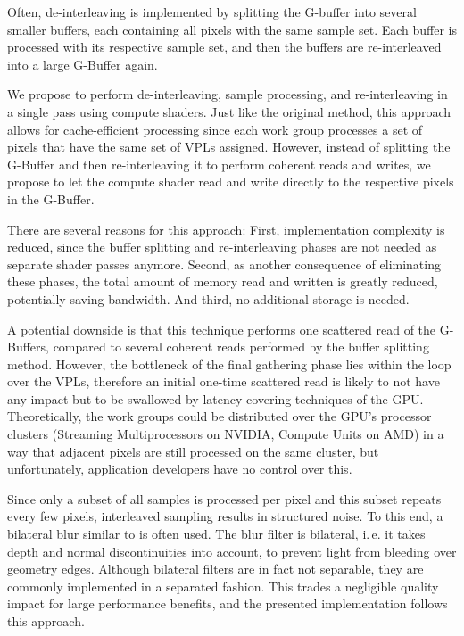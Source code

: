 Often, de-interleaving is implemented by splitting the G-buffer into several smaller buffers, each containing all pixels with the same sample set. Each buffer is processed with its respective sample set, and then the buffers are re-interleaved into a large G-Buffer again.

We propose to perform de-interleaving, sample processing, and re-interleaving in a single pass using compute shaders. Just like the original method, this approach allows for cache-efficient processing since each work group processes a set of pixels that have the same set of VPLs assigned. However, instead of splitting the G-Buffer and then re-interleaving it to perform coherent reads and writes, we propose to let the compute shader read and write directly to the respective pixels in the G-Buffer.

There are several reasons for this approach: First, implementation complexity is reduced, since the buffer splitting and re-interleaving phases are not needed as separate shader passes anymore. Second, as another consequence of eliminating these phases, the total amount of memory read and written is greatly reduced, potentially saving bandwidth. And third, no additional storage is needed.

A potential downside is that this technique performs one scattered read of the G-Buffers, compared to several coherent reads performed by the buffer splitting method. However, the bottleneck of the final gathering phase lies within the loop over the VPLs, therefore an initial one-time scattered read is likely to not have any impact but to be swallowed by latency-covering techniques of the GPU. Theoretically, the work groups could be distributed over the GPU's processor clusters (Streaming Multiprocessors on NVIDIA, Compute Units on AMD) in a way that adjacent pixels are still processed on the same cluster, but unfortunately, application developers have no control over this.

Since only a subset of all samples is processed per pixel and this subset repeats every few pixels, interleaved sampling results in structured noise. To this end, a bilateral blur similar to \citet{laine2007incremental} is often used. The blur filter is bilateral, i.\,e. it takes depth and normal discontinuities into account, to prevent light from bleeding over geometry edges. Although bilateral filters are in fact not separable, they are commonly implemented in a separated fashion. This trades a negligible quality impact for large performance benefits, and the presented implementation follows this approach.


